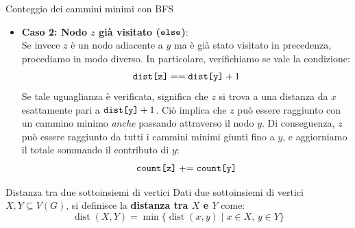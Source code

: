 \documentclass[12pt]{report}
\begin{document}
\begin{algoritmo}{Conteggio dei cammini minimi con BFS}{}
\begin{itemize}
\begin{itemize}
				\item \textbf{Caso 2: Nodo $z$ già visitato ($\text{\texttt{else}}$)}:\\
				Se invece $z$ è un nodo adiacente a $y$ ma è già stato visitato in precedenza, procediamo in modo diverso. In particolare, verifichiamo se vale la condizione:
				\[
				\text{\texttt{dist[z]}} == \text{\texttt{dist[y]}} + 1
				\]
				Se tale uguaglianza è verificata, significa che $z$ si trova a una distanza da $x$ esattamente pari a $\text{\texttt{dist[y]}} + 1$. Ciò implica che $z$ può essere raggiunto con un cammino minimo \emph{anche} passando attraverso il nodo $y$. Di conseguenza, $z$ può essere raggiunto da tutti i cammini minimi giunti fino a $y$, e aggiorniamo il totale sommando il contributo di $y$:
				\[
				\text{\texttt{count[z]}} \mathrel{+}= \text{\texttt{count[y]}}
				\]
			\end{itemize}
		\end{itemize}
	\end{algoritmo}
	
	\newpage
	\begin{definizione}{Distanza tra due sottoinsiemi di vertici}{}
		Dati due sottoinsiemi di vertici $X, Y \subseteq V(G)$, si definisce la \textbf{distanza tra $X$ e $Y$} come:
		\[
		\operatorname{dist}(X, Y) = \min \{ \operatorname{dist}(x, y) \mid x \in X, \, y \in Y \}
		\]
	\end{definizione}
	
\end{document}
